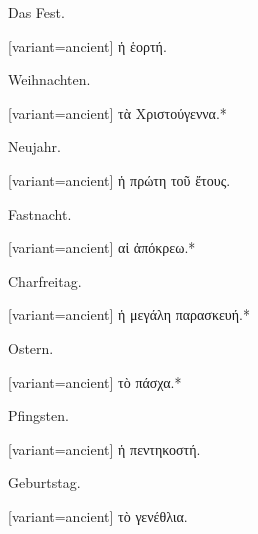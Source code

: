 Das Fest.

\switchcolumn

\begin{greek}[variant=ancient]%
ἡ ἑορτή.

\end{greek}%
\switchcolumn*

Weihnachten.

\switchcolumn

\begin{greek}[variant=ancient]%
τὰ Χριστούγεννα.{*}

\end{greek}%
\switchcolumn*

Neujahr.

\switchcolumn

\begin{greek}[variant=ancient]%
ἡ πρώτη τοῦ ἔτους.

\end{greek}%
\switchcolumn*

Fastnacht.

\switchcolumn

\begin{greek}[variant=ancient]%
αἱ ἀπόκρεω.{*}

\end{greek}%
\switchcolumn*

Charfreitag.

\switchcolumn

\begin{greek}[variant=ancient]%
ἡ μεγάλη παρασκευή.{*}

\end{greek}%
\switchcolumn*

Ostern.

\switchcolumn

\begin{greek}[variant=ancient]%
τὸ πάσχα.{*}

\end{greek}%
\switchcolumn*

Pfingsten.

\switchcolumn

\begin{greek}[variant=ancient]%
ἡ πεντηκοστή.

\end{greek}%
\switchcolumn*

Geburts\textcompwordmark{}tag.

\switchcolumn

\begin{greek}[variant=ancient]%
τὸ γενέθλια.

\end{greek}%
\switchcolumn*

